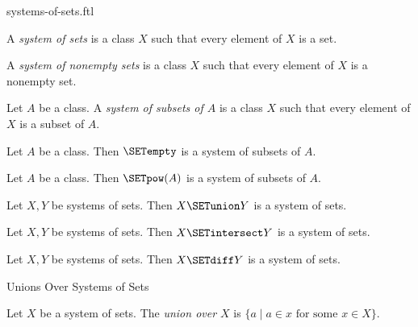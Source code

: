 \documentclass{naproche-library}
\begin{document}
\begin{smodule}[title=Systems of Sets]{systems-of-sets.ftl}

\begin{definition}[forthel,id=FOUNDATIONS_10_5805323570905088]
  A \emph{system of sets} is a class $X$ such that every element of $X$ is a set.
\end{definition}

\begin{definition}[forthel,id=FOUNDATIONS_10_1631952387964928]
  A \emph{system of nonempty sets} is a class $X$ such that every element of $X$ is a nonempty set.
\end{definition}

\begin{definition}[forthel,id=FOUNDATIONS_10_943381479948288]
  Let $A$ be a class.
  A \emph{system of subsets of $A$} is a class $X$ such that every element of $X$ is a subset of $A$.
\end{definition}

\begin{proposition}[forthel,id=FOUNDATIONS_10_8268633648136192]
  Let $A$ be a class.
  Then $\SETempty$ is a system of subsets of $A$.
\end{proposition}

\begin{proposition}[forthel,id=FOUNDATIONS_10_7546016869908480]
  Let $A$ be a class.
  Then $\SETpow(A)$ is a system of subsets of $A$.
\end{proposition}

\begin{proposition}
  Let $X, Y$ be systems of sets.
  Then $X \SETunion Y$ is a system of sets.
\end{proposition}

\begin{proposition}
  Let $X, Y$ be systems of sets.
  Then $X \SETintersect Y$ is a system of sets.
\end{proposition}

\begin{proposition}
  Let $X, Y$ be systems of sets.
  Then $X \SETdiff Y$ is a system of sets.
\end{proposition}

\begin{sfragment}{Unions Over Systems of Sets}
  \begin{definition}[forthel,id=FOUNDATIONS_10_541772562300928]
    Let $X$ be a system of sets.
    The \emph{union over $X$} is $\{ a \mid a \in x\text{ for some }x \in X \}$.


\end{definition}
\end{sfragment}
\end{smodule}
\end{document}

